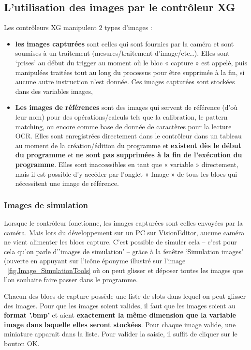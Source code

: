 \subsection{L'utilisation des images par le contrôleur XG}
\label{Sec.Images}
\noindent Les contrôleurs XG manipulent 2 types d’images :
\begin{itemize}
  \item \textbf{les images capturées} sont celles qui sont fournies par la caméra et
  sont soumises à un traitement (mesures/traitement d’image/etc…). Elles sont 
  ‘prises’ au début du trigger au moment où le bloc « capture » est appelé, puis
  manipulées traitées tout au long du processus pour être supprimée à la fin, si 
  aucune autre instruction n’est donnée. Ces images capturées sont stockées dans des
  variables images,
  \item \textbf{Les images de références} sont des images qui servent de référence
  (d’où leur   nom) pour des opérations/calculs tels que la calibration, le pattern
  matching, ou  encore comme base de donnée de caractères pour la lecture OCR. Elles
  sont enregistrées directement dans le contrôleur dans un tableau au moment de la 
  création/édition du programme et \textbf{existent dès le début du programme} et 
  \textbf{ne sont pas supprimées à la fin de l’exécution du programme}. Elles sont 
  inaccessibles en tant que « variable » directement, mais il est possible d’y accéder
  par l’onglet « Image » de tous les blocs qui nécessitent une image de référence.
\end{itemize}


\subsubsection{Images de simulation}
\label{Sec.Images_ImagesTypes}
Lorsque le contrôleur fonctionne, les images capturées sont celles envoyées par la caméra. Mais lors du développement sur un PC sur VisionEditor, aucune caméra ne vient alimenter les blocs capture. C’est possible de simuler cela – c’est pour cela qu’on parle d’’images de simulation’ – grâce à la fenêtre ‘Simulation images’ (ouverte en appuyant sur l'icône éponyme illustré sur l'image ~\ref{fig.Image_SimulationTools} où on peut glisser et déposer toutes les images que l’on souhaite faire passer dans le programme.

\vspace{0.2cm}
Chacun des blocs de capture possède une liste de slots dans lequel on peut glisser des images. Pour que les images soient valides, il faut que les images soient au \textbf{format '.bmp'} et aient \textbf{exactement la même dimension que la variable image dans laquelle elles seront stockées}. Pour chaque image valide, une miniature apparait dans la liste. Pour valider la saisie, il suffit de cliquer sur le bouton OK.

